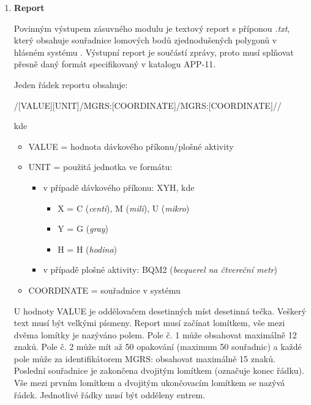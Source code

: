 \begin{enumerate}
	\item \textbf{Report}

Povinným výstupem zásuvného modulu je textový report s příponou \textit{.txt}, který obsahuje souřadnice lomových bodů zjednodušených polygonů v hlásném systému . Výstupní report je součástí  zprávy, proto musí splňovat přesně daný formát specifikovaný v katalogu APP-11. 

\newpage
Jeden řádek reportu obsahuje:

/[VALUE][UNIT]/MGRS:[COORDINATE]/MGRS:[COORDINATE]//

kde
\begin{itemize}
			\item VALUE = hodnota dávkového příkonu/plošné aktivity 
			
			\item UNIT = použitá jednotka ve formátu:
			
			\begin{itemize}
				\item v případě dávkového příkonu: XYH, kde
			 		\begin{itemize}
						\item X = C (\textit{centi}), M (\textit{mili}), U (\textit{mikro})
						\item Y = G (\textit{gray})
						\item H = H (\textit{hodina})
					\end{itemize}
				\item v případě plošné aktivity: BQM2 (\textit{becquerel na čtvereční metr})
			\end{itemize}
			
			\item COORDINATE = souřadnice v systému 
\end{itemize}
				
U hodnoty VALUE je oddělovačem desetinných míst desetinná tečka. Veškerý text musí být velkými písmeny. Report musí začínat lomítkem, vše mezi dvěma lomítky je nazýváno polem. Pole č. 1 může obsahovat maximálně 12 znaků. Pole č. 2 může mít až 50 opakování (maximum 50 souřadnic) a každé pole může za identifikátorem MGRS: obsahovat maximálně 15 znaků. Poslední souřadnice je zakončena dvojitým lomítkem (označuje konec řádku). Vše mezi prvním lomítkem a dvojitým ukončovacím lomítkem se nazývá řádek. Jednotlivé řádky musí být odděleny entrem.	


\end{enumerate}
